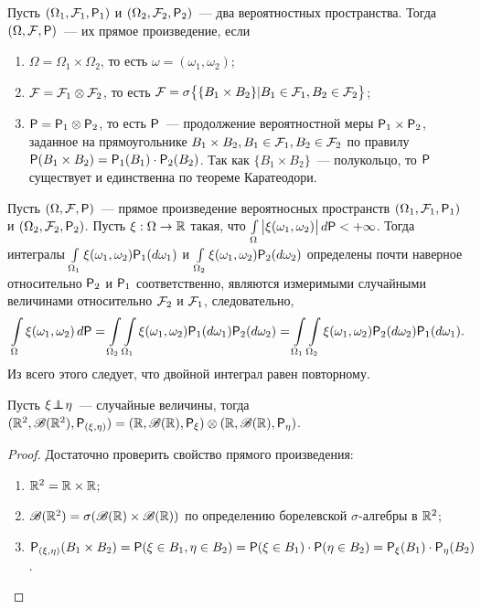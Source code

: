 \begin{definition}
	Пусть $(\Omega_1, \F_1, \P_1)$ и $(\Omega_2, \F_2, \P_2)$~--- два вероятностных пространства. Тогда $(\Omega, \F, \P)$~--- их прямое произведение, если 
	\begin{enumerate}
		\item $\Omega = \Omega_1 \times \Omega_2$, то есть $\omega = (\omega_1, \omega_2)$;
		\item $\F = \F_1 \otimes \F_2$, то есть $\F = \sigma\big\{ \{ B_1 \times B_2 \} | B_1 \in \F_1, B_2 \in \F_2 \big\}$;
		\item $\P = \P_1 \otimes \P_2$, то есть  $\P$~--- продолжение вероятностной меры $\P_1 \times \P_2$, заданное на прямоугольнике $B_1 \times B_2, B_1 \in \F_1, B_2 \in \F_2$ по правилу $\P(B_1 \times B_2) = \P_1 (B_1) \cdot \P_2 (B_2)$. Так как $\{B_1 \times B_2 \}$~--- полукольцо, то $\P$ существует и единственна по теореме Каратеодори.
	\end{enumerate}
\end{definition}
\begin{theorem}[Фубини][б/д]
	Пусть $(\Omega, \F, \P)$~--- прямое произведение вероятносных пространств $(\Omega_1, \F_1, \P_1)$ и $(\Omega_2, \F_2, \P_2)$. Пусть $\xi : \Omega \rightarrow \R$ такая, что $\int\limits_\Omega \big| \xi (\omega_1, \omega_2) \big| \, d \P < + \infty$. Тогда интегралы $\int\limits_{\Omega_1} \xi (\omega_1, \omega_2) \P_1 (d \omega_1)$ и $\int\limits_{\Omega_2} \xi(\omega_1, \omega_2) \P_2 (d \omega_2)$ определены почти наверное относительно $\P_2$ и $\P_1$ соответственно, являются измеримыми случайными величинами относительно $\F_2$ и $\F_1$, следовательно, 
	$$\int\limits_\Omega \xi (\omega_1, \omega_2) \, d \P = \int\limits_{\Omega_2} \int\limits_{\Omega_1} \xi (\omega_1, \omega_2) \P_1 (d \omega_1) \P_2 (d \omega_2) = \int\limits_{\Omega_1} \int\limits_{\Omega_2} \xi(\omega_1, \omega_2) \P_2 (d \omega_2) \P_1 (d \omega_1).$$
	 Из всего этого следует, что двойной интеграл равен повторному.
\end{theorem}

\begin{statement}
 	Пусть $\xi \indep \eta$~--- случайные величины, тогда $(\R^2, \B(\R^2), \P_{(\xi, \eta)}) = (\R, \B(\R), \P_\xi) \otimes (\R, \B(\R), \P_\eta)$.
 	\begin{proof} Достаточно проверить свойство прямого произведения:
 		\begin{enumerate}
 			\item $\R^2 = \R \times \R$;
 			\item $\B(\R^2) = \sigma(\B(\R) \times \B(\R))$ по определению борелевской $\sigma$-алгебры в $\R^2$;
 			\item $\P_{(\xi, \eta)} (B_1 \times B_2) = \P(\xi \in B_1, \eta \in B_2) = \P(\xi \in B_1) \cdot \P(\eta \in B_2) = \P_\xi(B_1) \cdot \P_\eta (B_2)$. \qedhere
 		\end{enumerate}
 	\end{proof}
\end{statement}

